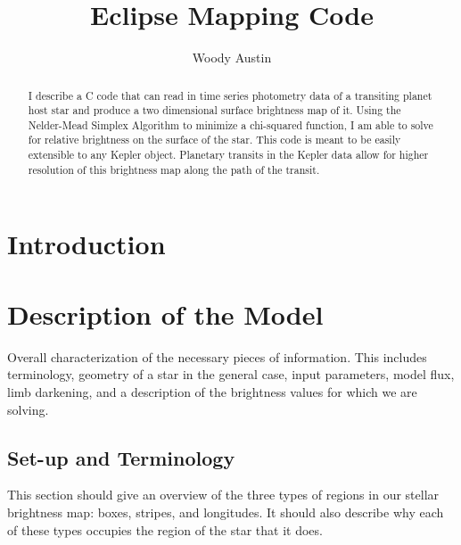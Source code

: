 \documentclass[iop]{emulateapj}
\begin{document}
\title{Eclipse Mapping Code}
\author{Woody Austin}

\begin{abstract}
I describe a C code that can read in time series photometry data of a transiting planet host star and produce a two dimensional surface brightness map of it. Using the Nelder-Mead Simplex Algorithm to minimize a chi-squared function, I am able to solve for relative brightness on the surface of the star. This code is meant to be easily extensible to any Kepler object. Planetary transits in the Kepler data allow for higher resolution of this brightness map along the path of the transit.
\end{abstract}
\maketitle

\section{Introduction \label{intro}}
\vspace{9mm}

\section{Description of the Model \label{description}}
Overall characterization of the necessary pieces of information. This includes terminology, geometry of a star in the general case, input parameters, model flux, limb darkening, and a description of the brightness values for which we are solving.

\subsection{Set-up and Terminology \label{description}}
This section should give an overview of the three types of regions in our stellar brightness map: boxes, stripes, and longitudes. It should also describe why each of these types occupies the region of the star that it does.
\end{document}
